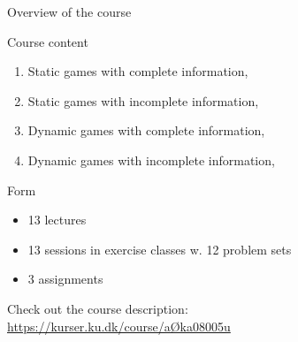\begin{frame}{Overview of the course}
\begin{multicols}{2}
Course content
\begin{enumerate}
  \item Static games with complete information,
  \item Static games with incomplete information,
  \item Dynamic games with complete information,
  \item Dynamic games with incomplete information,
\end{enumerate}
\columnbreak
Form
\begin{itemize}
  \item 13 lectures
  \item 13 sessions in exercise classes w. 12 problem sets
  \item 3 assignments
\end{itemize}
Check out the course description:
\\
\href{https://kurser.ku.dk/course/aØka08005u}{https://kurser.ku.dk/course/aØka08005u}
\end{multicols}
\end{frame}


